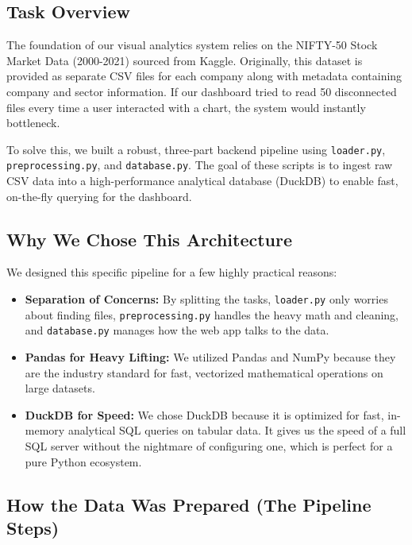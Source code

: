 \documentclass[14pt,a4paper]{extreport}
\begin{document}
\subsection{Task Overview}

The foundation of our visual analytics system relies on the NIFTY-50 Stock
Market Data (2000-2021) sourced from Kaggle. Originally, this dataset is
provided as separate CSV files for each company along with metadata
containing company and sector information. If our dashboard tried to read
50 disconnected files every time a user interacted with a chart, the system
would instantly bottleneck.

To solve this, we built a robust, three-part backend pipeline using
\texttt{loader.py}, \texttt{preprocessing.py}, and \texttt{database.py}.
The goal of these scripts is to ingest raw CSV data into a high-performance
analytical database (DuckDB) to enable fast, on-the-fly querying for the
dashboard.

\subsection{Why We Chose This Architecture}

We designed this specific pipeline for a few highly practical reasons:

\begin{itemize}
    \item \textbf{Separation of Concerns:} By splitting the tasks,
        \texttt{loader.py} only worries about finding files,
        \texttt{preprocessing.py} handles the heavy math and cleaning, and
        \texttt{database.py} manages how the web app talks to the data.
    \item \textbf{Pandas for Heavy Lifting:} We utilized Pandas and NumPy
        because they are the industry standard for fast, vectorized
        mathematical operations on large datasets.
    \item \textbf{DuckDB for Speed:} We chose DuckDB because it is
        optimized for fast, in-memory analytical SQL queries on tabular
        data. It gives us the speed of a full SQL server without the
        nightmare of configuring one, which is perfect for a pure Python
        ecosystem.
\end{itemize}

\subsection{How the Data Was Prepared (The Pipeline Steps)}
\end{document}
